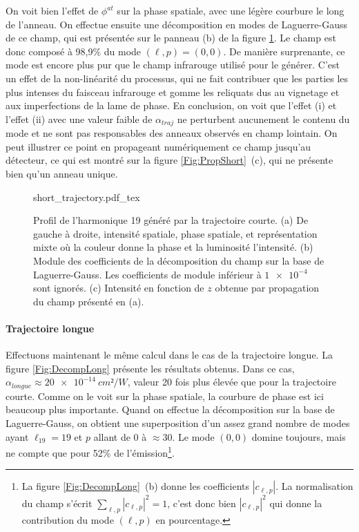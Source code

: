 On voit bien l'effet de $\phi^{at}$ sur la phase spatiale, avec une légère courbure le long de l'anneau. On effectue ensuite une décomposition en modes de Laguerre-Gauss de ce champ, qui est présentée sur le panneau (b) de la figure \ref{Fig:DecompShort}. Le champ est donc composé à 98,9\% du mode $(\ell,p) = (0,0)$. De manière surprenante, ce mode est encore plus pur que le champ infrarouge utilisé pour le générer. C'est un effet de la non-linéarité du processus, qui ne fait contribuer que les parties les plus intenses du faisceau infrarouge et gomme les reliquats dus au vignetage et aux imperfections de la lame de phase. En conclusion, on voit que l'effet (i) et l'effet (ii) avec une valeur faible de $\alpha_{traj}$ ne perturbent aucunement le contenu du mode et ne sont pas responsables des anneaux observés en champ lointain. On peut illustrer ce point en propageant numériquement ce champ jusqu'au détecteur, ce qui est montré sur la figure \ref{Fig:PropShort}~(c), qui ne présente bien qu'un anneau unique.
\begin{figure}[!ht]
\centering
\def\svgwidth{\columnwidth}
{short_trajectory.pdf_tex}
\caption{Profil de l'harmonique 19 généré par la trajectoire courte. (a) De gauche à droite, intensité spatiale, phase spatiale, et représentation mixte où la couleur donne la phase et la luminosité l'intensité. (b) Module des coefficients de la décomposition du champ sur la base de Laguerre-Gauss. Les coefficients de module inférieur à $\num{1e-4}$ sont ignorés. (c) Intensité en fonction de $z$ obtenue par propagation du champ présenté en (a).}
\label{Fig:DecompShort}
\end{figure}

\paragraph*{Trajectoire longue} Effectuons maintenant le même calcul dans le cas de la trajectoire longue. La figure \ref{Fig:DecompLong} présente les résultats obtenus. Dans ce cas, $\alpha_{longue}\approx\SI{20e-14}{cm²/W}$, valeur 20 fois plus élevée que pour la trajectoire courte. Comme on le voit sur la phase spatiale, la courbure de phase est ici beaucoup plus importante. Quand on effectue la décomposition sur la base de Laguerre-Gauss, on obtient une superposition d'un assez grand nombre de modes ayant $\ell_{19}=19$ et $p$ allant de 0 à $\approx 30$. Le mode $(0,0)$ domine toujours, mais ne compte que pour 52\% de l'émission\footnote{La figure \ref{Fig:DecompLong}~(b) donne les coefficients $\left|c_{\ell,p}\right|$. La normalisation du champ s'écrit $\sum_{\ell,p}{\left|c_{\ell,p}\right|^2} = 1$, c'est donc bien $\left|c_{\ell,p}\right|^2$ qui donne la contribution du mode $(\ell,p)$ en pourcentage.}. 

